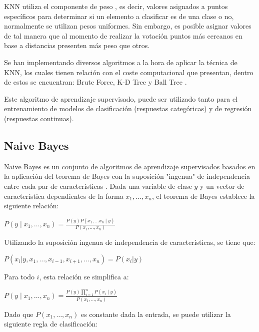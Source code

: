 KNN utiliza el componente de peso \cite{TAN2005667}, es decir, valores asignados a puntos específicos para determinar si un elemento a clasificar es de una clase o no, normalmente se utilizan pesos uniformes. Sin embargo, es posible asignar valores de tal manera que al momento de realizar la votación puntos más cercanos en base a distancias presenten más peso que otros.

Se han implementando diversos algoritmos a la hora de aplicar la técnica de KNN, los cuales tienen relación con el coste computacional que presentan, dentro de estos se encuentran: Brute Force, K-D Tree y Ball Tree \cite{pedregosa2011scikit}.

Este algoritmo de aprendizaje supervisado, puede ser utilizado tanto para el entrenamiento de modelos de clasificación (respuestas categóricas) y de regresión (respuestas continuas).

\subsection{Naive Bayes}

Naive Bayes es un conjunto de algoritmos de aprendizaje supervisados basados en la aplicación del teorema de Bayes con la suposición "ingenua" de independencia entre cada par de características \cite{zhang2004optimality}. Dada una variable de clase $y$ y un vector de característica dependientes de la forma $x_1,..., x_n$, el teorema de Bayes establece la siguiente relación:

\begin{center}
	$P(y \mid x_1, \dots, x_n) = \frac{P(y) P(x_1, \dots x_n \mid y)} {P(x_1, \dots, x_n)}
	$
\end{center}

Utilizando la suposición ingenua de independencia de características, se tiene que:

\begin{center}
	$P(x_i | y, x_1, \dots, x_{i-1}, x_{i+1}, \dots, x_n) = P(x_i | y)$
\end{center}

Para todo $i$, esta relación se simplifica a:

\begin{center}
	$P(y \mid x_1, \dots, x_n) = \frac{P(y) \prod_{i=1}^{n} P(x_i \mid y)} {P(x_1, \dots, x_n)}$
\end{center}

Dado que $P(x_1, \dots, x_n)$ es constante dada la entrada, se puede utilizar la siguiente regla de clasificación:


